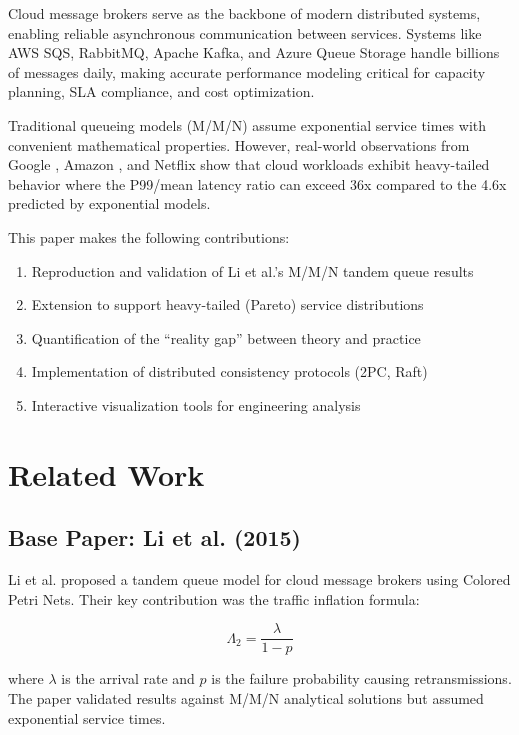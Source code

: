 \documentclass[conference,twocolumn]{IEEEtran}
\begin{document}
Cloud message brokers serve as the backbone of modern distributed systems, enabling reliable asynchronous communication between services. Systems like AWS SQS, RabbitMQ, Apache Kafka, and Azure Queue Storage handle billions of messages daily, making accurate performance modeling critical for capacity planning, SLA compliance, and cost optimization.

Traditional queueing models (M/M/N) assume exponential service times with convenient mathematical properties. However, real-world observations from Google \cite{dean2013}, Amazon \cite{decandia2007}, and Netflix show that cloud workloads exhibit heavy-tailed behavior where the P99/mean latency ratio can exceed 36x compared to the 4.6x predicted by exponential models.

This paper makes the following contributions:
\begin{enumerate}[leftmargin=*]
    \item Reproduction and validation of Li et al.'s M/M/N tandem queue results
    \item Extension to support heavy-tailed (Pareto) service distributions
    \item Quantification of the ``reality gap'' between theory and practice
    \item Implementation of distributed consistency protocols (2PC, Raft)
    \item Interactive visualization tools for engineering analysis
\end{enumerate}

\section{Related Work}

\subsection{Base Paper: Li et al. (2015)}

Li et al. \cite{li2015} proposed a tandem queue model for cloud message brokers using Colored Petri Nets. Their key contribution was the traffic inflation formula:

\begin{equation}
\Lambda_2 = \frac{\lambda}{1-p}
\end{equation}

where $\lambda$ is the arrival rate and $p$ is the failure probability causing retransmissions. The paper validated results against M/M/N analytical solutions but assumed exponential service times.
\end{document}
